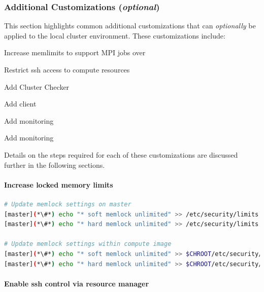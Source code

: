 \documentclass[letterpaper]{article}
\begin{document}
\subsubsection{Additional Customizations ({\em optional})} \label{sec:addl_customizations}

This section highlights common additional customizations that
can {\em optionally} be applied to the
local cluster environment. These customizations include:

\begin{itemize*}
\item Increase memlimits to support MPI jobs over \InfiniBand{}
\item Restrict ssh access to compute resources
\item Add Cluster Checker
\item Add \Lustre{} client
\item Add \Nagios{} monitoring
\item Add \Ganglia{} monitoring
\end{itemize*}

\noindent Details on the steps required for each of these customizations are
discussed further in the following sections.

\paragraph{Increase locked memory limits}

 

\begin{lstlisting}[language=bash,keywords={},upquote=true]
# Update memlock settings on master
[master](*\#*) echo "* soft memlock unlimited" >> /etc/security/limits.conf
[master](*\#*) echo "* hard memlock unlimited" >> /etc/security/limits.conf

# Update memlock settings within compute image
[master](*\#*) echo "* soft memlock unlimited" >> $CHROOT/etc/security/limits.conf
[master](*\#*) echo "* hard memlock unlimited" >> $CHROOT/etc/security/limits.conf
\end{lstlisting}


\paragraph{Enable ssh control via resource manager} 
\end{document}
